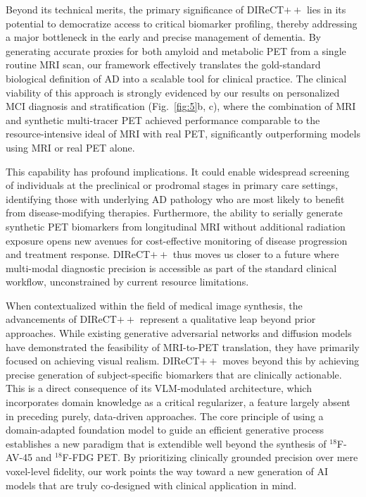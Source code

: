 \documentclass[a4paper]{cas-sc}
\begin{document}
Beyond its technical merits, the primary significance of DIReCT$++$ lies in its potential to democratize access to critical biomarker profiling, thereby addressing a major bottleneck in the early and precise management of dementia. By generating accurate proxies for both amyloid and metabolic PET from a single routine MRI scan, our framework effectively translates the gold-standard biological definition of AD into a scalable tool for clinical practice. The clinical viability of this approach is strongly evidenced by our results on personalized MCI diagnosis and stratification (Fig.~\ref{fig:5}b, c), where the combination of MRI and synthetic multi-tracer PET achieved performance comparable to the resource-intensive ideal of MRI with real PET, significantly outperforming models using MRI or real PET alone. 

This capability has profound implications. It could enable widespread screening of individuals at the preclinical or prodromal stages in primary care settings, identifying those with underlying AD pathology who are most likely to benefit from disease-modifying therapies. Furthermore, the ability to serially generate synthetic PET biomarkers from longitudinal MRI without additional radiation exposure opens new avenues for cost-effective monitoring of disease progression and treatment response. DIReCT$++$ thus moves us closer to a future where multi-modal diagnostic precision is accessible as part of the standard clinical workflow, unconstrained by current resource limitations.

When contextualized within the field of medical image synthesis, the advancements of DIReCT$++$ represent a qualitative leap beyond prior approaches. While existing generative adversarial networks and diffusion models have demonstrated the feasibility of MRI-to-PET translation, they have primarily focused on achieving visual realism. DIReCT$++$ moves beyond this by achieving precise generation of subject-specific biomarkers that are clinically actionable. This is a direct consequence of its VLM-modulated architecture, which incorporates domain knowledge as a critical regularizer, a feature largely absent in preceding purely, data-driven approaches. The core principle of using a domain-adapted foundation model to guide an efficient generative process establishes a new paradigm that is extendible well beyond the synthesis of $^{18}$F-AV-45 and $^{18}$F-FDG PET. By prioritizing clinically grounded precision over mere voxel-level fidelity, our work points the way toward a new generation of AI models that are truly co-designed with clinical application in mind.
\end{document}
